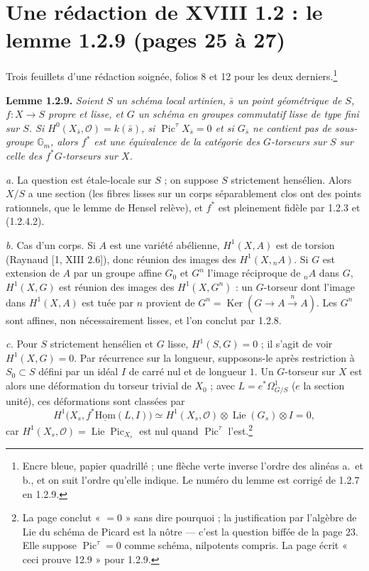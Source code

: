 \documentclass[11pt,a4paper]{article}
\begin{document}
\section*{Une rédaction de XVIII 1.2 : le lemme 1.2.9 (pages 25 à 27)}

Trois feuillets d'une rédaction soignée, folios 8 et 12 pour les deux
derniers.\footnote{Encre bleue, papier quadrillé ; une flèche verte inverse
l'ordre des alinéas a.\ et b., et on suit l'ordre qu'elle indique. Le numéro
du lemme est corrigé de 1.2.7 en 1.2.9.}

\textbf{Lemme 1.2.9.} \emph{Soient $S$ un schéma local artinien, $\bar s$ un
point géométrique de $S$, $f\colon X \to S$ propre et lisse, et $G$ un schéma
en groupes commutatif lisse de type fini sur $S$. Si $H^0(X_{\bar s},
\mathcal{O}) = k(\bar s)$, si $\operatorname{Pic}^{\tau}X_{\bar s} = 0$ et si
$G_{\bar s}$ ne contient pas de sous-groupe $\mathbb{G}_m$, alors $f^*$ est une
équivalence de la catégorie des $G$-torseurs sur $S$ sur celle des
$f^*G$-torseurs sur $X$.}

\emph{a.} La question est étale-locale sur $S$ ; on suppose $S$ strictement
hensélien. Alors $X/S$ a une section (les fibres lisses sur un corps
séparablement clos ont des points rationnels, que le lemme de Hensel relève),
et $f^*$ est pleinement fidèle par 1.2.3 et (1.2.4.2).

\emph{b.} Cas d'un corps. Si $A$ est une variété abélienne, $H^1(X, A)$ est
de torsion (Raynaud [1, XIII 2.6]), donc réunion des images des $H^1(X,
{}_nA)$. Si $G$ est extension de $A$ par un groupe affine $G_0$ et $G^n$ l'image
réciproque de ${}_nA$ dans $G$, $H^1(X, G)$ est réunion des images des
$H^1(X, G^n)$ : un $G$-torseur dont l'image dans $H^1(X, A)$ est tuée par $n$
provient de $G^n = \operatorname{Ker}(G \to A \xrightarrow{n} A)$. Les $G^n$
sont affines, non nécessairement lisses, et l'on conclut par 1.2.8.

\emph{c.} Pour $S$ strictement hensélien et $G$ lisse, $H^1(S, G) = 0$ ; il
s'agit de voir $H^1(X, G) = 0$. Par récurrence sur la longueur, supposons-le
après restriction à $S_0 \subset S$ défini par un idéal $I$ de carré nul et de
longueur $1$. Un $G$-torseur sur $X$ est alors une déformation du torseur
trivial de $X_0$ ; avec $L = e^*\Omega^1_{G/S}$ ($e$ la section unité), ces
déformations sont classées par
\[
H^1\bigl(X_{s}, f^*\underline{\mathrm{Hom}}(L, I)\bigr) \simeq
H^1(X_s, \mathcal{O}) \otimes \operatorname{Lie}(G_s) \otimes I = 0,
\]
car $H^1(X_s, \mathcal{O}) = \operatorname{Lie}\operatorname{Pic}_{X_s}$ est
nul quand $\operatorname{Pic}^{\tau}$ l'est.\footnote{La page conclut « $= 0$ »
sans dire pourquoi ; la justification par l'algèbre de Lie du schéma de
Picard est la nôtre --- c'est la question biffée de la page 23. Elle
suppose $\operatorname{Pic}^{\tau} = 0$ comme schéma, nilpotents compris. La
page écrit « ceci prouve 12.9 » pour 1.2.9.}
\end{document}
